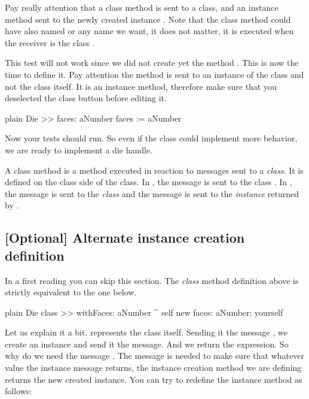 \documentclass[10pt,twoside,english]{_support/latex/sbabook/sbabook}
\begin{document}
Pay really attention that a class method  is sent to a class, and an instance method sent to the newly created instance . Note that the class method could have also named  or any name we want, it does not matter, it is executed when the receiver is the class .

This test will not work since we did not create yet the method .  This is now the time to define it. Pay attention the method  is sent to an instance of the class  and not the class itself. It is an instance method, therefore make sure that you deselected the class button before editing it.

\begin{displaycode}{plain}
Die >> faces: aNumber
	faces := aNumber
\end{displaycode}

Now your tests should run. So even if the class  could implement more behavior, we are ready to implement a die handle. 

\begin{important}
A class method is a method executed in reaction to messages sent to a \textit{class}. It is defined on the class side of the class. In , the message  is sent to the class . In , the message  is sent to the \textit{class}  and the message  is sent to the \textit{instance} returned by . 
\end{important}
\subsection{{[}Optional{]} Alternate instance creation definition}
 In a first reading you can skip this section. The \textit{class} method definition  above is strictly equivalent to the one below.

\begin{displaycode}{plain}
Die class >> withFaces: aNumber
	^ self new faces: aNumber; yourself
\end{displaycode}

Let us explain it a bit.  represents the class  itself. Sending it the message , we create an instance and send it the  message. And we return the expression. So why do we need the message . The message  is needed to make sure that whatever value the instance message  returns, the instance creation method we are defining returns the new created instance. You can try to redefine the instance method  as follows:
\end{document}
